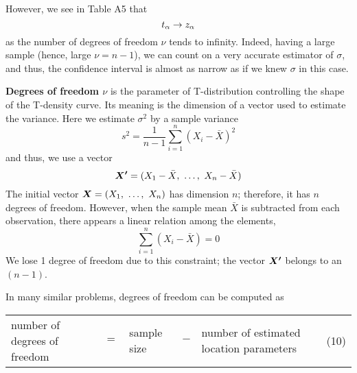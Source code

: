 \vspace*{\fill}
\columnbreak

However, we see in Table A5 that
\begin{equation*}
  t_{\alpha} \rightarrow z_{\alpha}
\end{equation*}
as the number of degrees of freedom $\nu$ tends to infinity. Indeed, having a large sample (hence, large $\nu = n - 1$), we can count on a very accurate estimator of $\sigma$, and thus, the confidence interval is almost as narrow as if we knew $\sigma$ in this case.

\textbf{Degrees of freedom $\nu$} is the parameter of T-distribution controlling the shape of the T-density curve. Its meaning is the dimension of a vector used to estimate the variance. Here we estimate $\sigma^2$ by a sample variance
\begin{equation*}
  s^2 = \frac{1}{n - 1} \sum_{i=1}^{n} (X_i - \bar{X})^2
\end{equation*}
and thus, we use a vector
\begin{equation*}
  \boldsymbol{X'} = (X_1 - \bar{X},\ \ldots,\ X_n - \bar{X})
\end{equation*}
The initial vector $\boldsymbol{X} = (X_1,\ \ldots,\ X_n)$ has dimension $n$; therefore, it has $n$ degrees of freedom. However, when the sample mean $\bar{X}$ is subtracted from each observation, there appears a linear relation among the elements,
\begin{equation*}
  \sum_{i=1}^{n} (X_i - \bar{X}) = 0
\end{equation*}
We lose 1 degree of freedom due to this constraint; the vector $\boldsymbol{X'}$ belongs to an $(n - 1)$.

In many similar problems, degrees of freedom can be computed as
\begin{table}[H]
  \centering
  \begin{tabular}{p{2cm} c p{2cm} c p{2cm} r}
    number of degrees of freedom & $=$ & sample size & $-$ & number of estimated location parameters & (10) \\
  \end{tabular}
\end{table}
